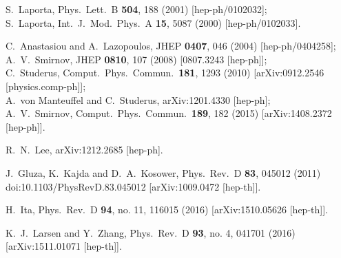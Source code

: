 \documentclass[aps,prd,preprint,groupedaddress,nofootinbib,showpacs,eqsecnum]{revtex4}
\begin{document}
\begin{thebibliography}{99}
S.~Laporta,
Phys.\ Lett.\  B {\bf 504}, 188 (2001)
[hep-ph/0102032];\\
S.~Laporta,
Int.\ J.\ Mod.\ Phys.\ A {\bf 15}, 5087 (2000)
[hep-ph/0102033].

C.~Anastasiou and A.~Lazopoulos,
JHEP {\bf 0407}, 046 (2004)
[hep-ph/0404258];\\
A.~V.~Smirnov,
JHEP {\bf 0810}, 107 (2008)
[0807.3243 [hep-ph]];\\
C.~Studerus,
Comput.\ Phys.\ Commun.\  {\bf 181}, 1293 (2010)
[arXiv:0912.2546 [physics.comp-ph]];\\
A.~von Manteuffel and C.~Studerus,
arXiv:1201.4330 [hep-ph];\\
A.~V.~Smirnov,
Comput.\ Phys.\ Commun.\  {\bf 189}, 182 (2015)
[arXiv:1408.2372 [hep-ph]].

R.~N.~Lee,
arXiv:1212.2685 [hep-ph].

J.~Gluza, K.~Kajda and D.~A.~Kosower,
Phys.\ Rev.\ D {\bf 83}, 045012 (2011)
doi:10.1103/PhysRevD.83.045012
[arXiv:1009.0472 [hep-th]].

H.~Ita,
Phys.\ Rev.\ D {\bf 94}, no. 11, 116015 (2016)
[arXiv:1510.05626 [hep-th]].

K.~J.~Larsen and Y.~Zhang,
Phys.\ Rev.\ D {\bf 93}, no. 4, 041701 (2016)
[arXiv:1511.01071 [hep-th]].


\end{thebibliography}
\end{document}
